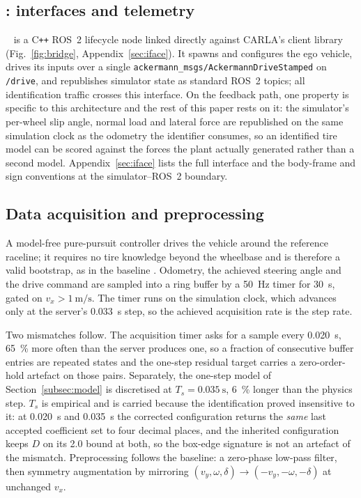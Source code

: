 \subsection{\textup{\bridge{}}: interfaces and telemetry}
\label{subsec:bridge}

\bridge{}~\cite{carlaasubridge} is a C\texttt{++} ROS~2 lifecycle node linked
directly against CARLA's client library (Fig.~\ref{fig:bridge},
Appendix~\ref{sec:iface}). It spawns and
configures the ego vehicle, drives its inputs over a single
\texttt{ack\-er\-mann\_msgs/AckermannDriveStamped} on \texttt{/drive}, and
republishes simulator state as standard ROS~2 topics; all identification traffic
crosses this interface. On the feedback path, one property is specific to this
architecture and the rest of this paper rests on it: the simulator's per-wheel
slip angle, normal load and lateral force are republished on the same
simulation clock as the odometry the identifier consumes, so an identified tire
model can be scored against the forces the plant actually generated rather than
a second model. Appendix~\ref{sec:iface} lists the full interface and the
body-frame and sign conventions at the simulator--ROS~2 boundary.

\subsection{Data acquisition and preprocessing}
\label{subsec:data}

A model-free pure-pursuit controller drives the vehicle around the reference
raceline; it requires no tire knowledge beyond the wheelbase and is therefore a
valid bootstrap, as in the baseline \cite{ontrack2025,forzaeth2024}. Odometry,
the achieved steering angle and the drive command are sampled into a ring buffer
by a \SI{50}{\hertz} timer for \SI{30}{\second}, gated on
$v_{x}>\SI{1}{\meter\per\second}$. The timer runs on the simulation clock, which
advances only at the server's \SI{0.033}{\second} step, so the achieved
acquisition rate is the step rate.

Two mismatches follow. The acquisition timer asks for a sample every
\SI{0.020}{\second}, \SI{65}{\percent} more often than the server produces one,
so a fraction of consecutive buffer entries are repeated states and the one-step
residual target carries a zero-order-hold artefact on those pairs. Separately,
the one-step model of Section~\ref{subsec:model} is discretised at
$T_{s}=\SI{0.035}{\second}$, \SI{6}{\percent} longer than the physics step.
$T_{s}$ is empirical and is carried because the identification proved
insensitive to it: at \SI{0.020}{\second} and \SI{0.035}{\second} the corrected
configuration returns the \emph{same} last accepted coefficient set to four
decimal places, and the inherited configuration keeps $D$ on its \num{2.0} bound
at both, so the box-edge signature is not an artefact of the mismatch.
Preprocessing follows the baseline: a zero-phase low-pass filter, then symmetry
augmentation by mirroring
$(v_{y},\omega,\delta)\rightarrow(-v_{y},-\omega,-\delta)$ at unchanged $v_{x}$.

